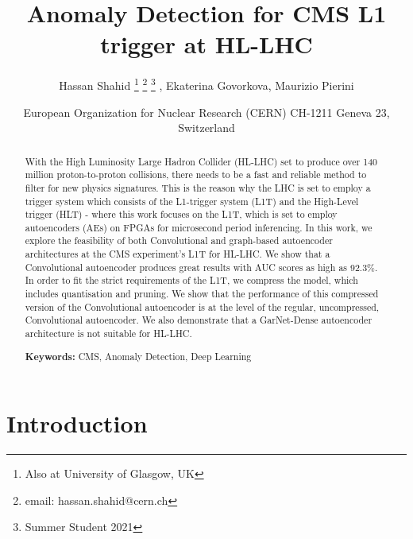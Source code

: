 \documentclass[a4paper]{article}
\title{Anomaly Detection for CMS L1 trigger at HL-LHC}
\author{Hassan Shahid \thanks{Also at University of Glasgow, UK} \thanks{email: hassan.shahid@cern.ch} \thanks{Summer Student 2021} , Ekaterina Govorkova, Maurizio Pierini}
\date{
    \small European Organization for Nuclear Research (CERN) CH-1211 Geneva 23, Switzerland \\%
}
\theoremstyle{plain}
\theoremstyle{definition}
\begin{document}
    \maketitle
    
    \begin{abstract}
        
        With the High Luminosity Large Hadron Collider (HL-LHC) set to produce over 140 million proton-to-proton collisions, there needs to be a fast and reliable method to filter for new physics signatures. This is the reason why the LHC is set to employ a trigger system which consists of the L1-trigger system (L1T) and the High-Level trigger (HLT) - where this work focuses on the L1T, which is set to employ autoencoders (AEs) on FPGAs for microsecond period inferencing. In this work, we explore the feasibility of both Convolutional and graph-based autoencoder architectures at the CMS experiment's L1T for HL-LHC. We show that a Convolutional autoencoder produces great results with AUC scores as high as 92.3\%. In order to fit the strict requirements of the L1T, we compress the model, which includes quantisation and pruning. We show that the performance of this compressed version of the Convolutional autoencoder is at the level of the regular, uncompressed, Convolutional autoencoder. We also demonstrate that a GarNet-Dense autoencoder architecture is not suitable for HL-LHC. 
        
        \noindent\textbf{Keywords:} CMS, Anomaly Detection, Deep Learning
    \end{abstract}
    
    \clearpage

    \tableofcontents
    
    \clearpage
    
    \section{Introduction}
    \label{sec:intro}
    
\end{document}
